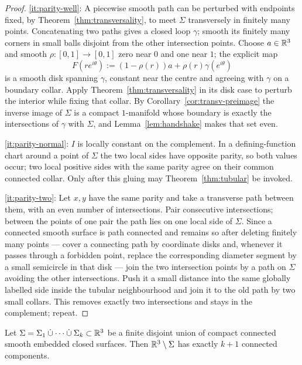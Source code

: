 \begin{proof}
\ref{it:parity-well}: A piecewise smooth path can be perturbed with endpoints
fixed, by Theorem~\ref{thm:transversality}, to meet $\Sigma$ transversely in
finitely many points.  Concatenating two paths gives a closed loop $\gamma$;
smooth its finitely many corners in small balls disjoint from the other
intersection points.  Choose $a\in\mathbb R^3$ and smooth
$\rho:[0,1]\to[0,1]$ zero near $0$ and one near $1$; the explicit map
\begin{equation}\label{eq:spanning-disk}
  F(re^{i\theta}):=(1-\rho(r))a+\rho(r)\gamma(e^{i\theta})
\end{equation}
is a smooth disk spanning $\gamma$, constant near the centre and agreeing with
$\gamma$ on a boundary collar.  Apply Theorem~\ref{thm:transversality} in its
disk case to perturb the interior while fixing that collar.  By
Corollary~\ref{cor:transv-preimage} the inverse image of $\Sigma$ is a compact
$1$-manifold whose boundary is exactly the intersections of $\gamma$ with
$\Sigma$, and Lemma~\ref{lem:handshake} makes that set even.

\ref{it:parity-normal}: $I$ is locally constant on the complement.  In a
defining-function chart around a point of $\Sigma$ the two local sides have
opposite parity, so both values occur; two local positive sides with the same
parity agree on their common connected collar.  Only after this gluing may
Theorem~\ref{thm:tubular} be invoked.

\ref{it:parity-two}: Let $x,y$ have the same parity and take a transverse path
between them, with an even number of intersections.  Pair consecutive
intersections; between the points of one pair the path lies on one local side
of $\Sigma$.  Since a connected smooth surface is path connected and remains
so after deleting finitely many points --- cover a connecting path by
coordinate disks and, whenever it passes through a forbidden point, replace
the corresponding diameter segment by a small semicircle in that disk --- join
the two intersection points by a path on $\Sigma$ avoiding the other
intersections.  Push it a small distance into the same globally labelled side
inside the tubular neighbourhood and join it to the old path by two small
collars.  This removes exactly two intersections and stays in the complement;
repeat.
\end{proof}

\begin{theorem}
\label{thm:component-count}
Let $\Sigma=\Sigma_1\mathbin{\dot\cup}\cdots\mathbin{\dot\cup}\Sigma_k\subset\mathbb R^3$
be a finite disjoint union of compact connected smooth embedded closed
surfaces.  Then $\mathbb R^3\setminus\Sigma$ has exactly $k+1$ connected components.
\end{theorem}

